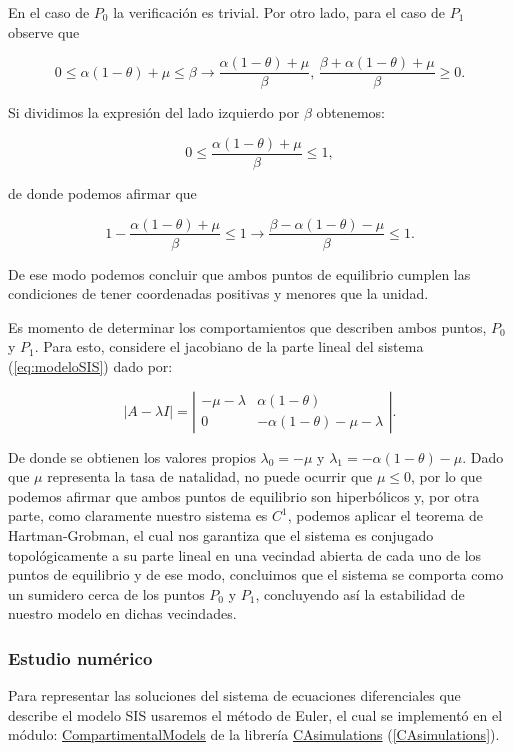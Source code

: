 En el caso de $P_0$ la verificación es trivial. Por otro lado, para el caso de $P_1$ observe que 

$$0\leq\alpha(1-\theta)+\mu\leq\beta \longrightarrow \frac{\alpha(1-\theta)+\mu}{\beta}\text{, }\frac{\beta+\alpha(1-\theta)+\mu}{\beta}\geq0.$$

Si dividimos la expresión del lado izquierdo por $\beta$ obtenemos:

$$0\leq \frac{\alpha(1-\theta)+\mu}{\beta}\leq1,$$

de donde podemos afirmar que 

$$1-\frac{\alpha(1-\theta)+\mu}{\beta}\leq1 \longrightarrow \frac{\beta-\alpha(1-\theta)-\mu}{\beta}\leq1.$$

De ese modo podemos concluir que ambos puntos de equilibrio cumplen las condiciones de tener coordenadas positivas y menores que la unidad.

Es momento de determinar los comportamientos que describen ambos puntos, $P_0$ y $P_1$. Para esto, considere el jacobiano de la parte lineal del sistema (\ref{eq:modeloSIS}) dado por:

$$|A-\lambda I|=
\left|\begin{array}{cc}
-\mu-\lambda & \alpha(1-\theta) \\
0 & -\alpha(1-\theta)-\mu-\lambda
\end{array}\right|.$$

De donde se obtienen los valores propios $\lambda_0 = -\mu$ y $\lambda_1 = -\alpha(1-\theta)-\mu$. Dado que $\mu$ representa la tasa de natalidad, no puede ocurrir que $\mu\leq0$, por lo que podemos afirmar que ambos puntos de equilibrio son hiperbólicos y, por otra parte, como claramente nuestro sistema es $C^1$, podemos aplicar el teorema de Hartman-Grobman, el cual nos garantiza que el sistema es conjugado topológicamente a su parte lineal en una vecindad abierta de cada uno de los puntos de equilibrio y de ese modo, concluimos que el sistema se comporta como un sumidero cerca de los puntos $P_0$ y $P_1$, concluyendo así la estabilidad de nuestro modelo en dichas vecindades.

\subsubsection{Estudio numérico}

Para representar las soluciones del sistema de ecuaciones diferenciales que describe el modelo SIS usaremos el método de Euler, el cual se implementó en el módulo:
\href{https://github.com/Grupo-de-simulacion-con-automatas/Prediccion-del-comportamiento-de-una-enfermedad-simulada-en-AC-con-un-algoritmo-en-RN/blob/master/Codigo/1.\%20Modelos\%20compartimentales\%20en\%20ecuaciones\%20diferenciales.ipynb}{\underline{CompartimentalModels}} de la librería \href{https://github.com/Grupo-de-simulacion-con-automatas/Prediccion-del-comportamiento-de-una-enfermedad-simulada-en-AC-con-un-algoritmo-en-RN/tree/master/Codigo/CAsimulation}{CAsimulations} (\ref{CAsimulations}).

